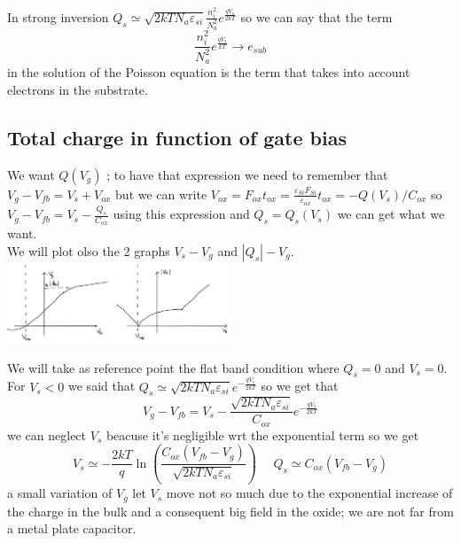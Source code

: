 \vspace{5mm}
In strong inversion $Q_s\simeq \sqrt{2kTN_a\varepsilon_{si}}\frac{n_i^2}{N_a^2}e^{\frac{qV_s}{2kT}}$ so we can say that the term
\begin{equation}
\frac{n_i^2}{N_a^2}e^{\frac{qV_s}{kT}}\rightarrow e_{sub}
\end{equation}
in the solution of the Poisson equation is the term that takes into account electrons in the substrate.\\

\subsection{Total charge in function of gate bias}
We want $Q(V_g)$ ; to have that expression we need to remember that $V_g-V_{fb}=V_s+V_{ox}$ but we can write $V_{ox}=F_{ox}t_{ox}=\frac{\varepsilon_{Si}F_{Si}}{\varepsilon_{ox}}t_{ox}=-Q(V_s)/C_{ox}$ so $V_g-V_{fb}=V_s-\frac{Q_s}{C_{ox}}$ using this expression and $Q_s=Q_s(V_s)$ we can get what we want.\\
We will plot olso the 2 graphs $V_s-V_g$ and $|Q_s|-V_g$.\\

\centering
\includegraphics[width=0.5\textwidth]{qvs.png}\\
\raggedright


We will take as reference point the flat band condition where $Q_s=0$ and $V_s=0$.\\

\vspace{5mm}
For $V_s<0$ we said that  $Q_s\simeq \sqrt{2kTN_a\varepsilon_{si}}e^{-\frac{qV_s}{2kT}}$ so we get that
\begin{equation}
V_g-V_{fb}=V_s-\frac{\sqrt{2kTN_a\varepsilon_{si}}}{C_{ox}}e^{-\frac{qV_s}{2kT}}
\end{equation} 
we can neglect $V_s$ beacuse it's negligible wrt the exponential term so we get 
\begin{equation}
V_s\simeq-\frac{2kT}{q}\ln\left(\frac{C_{ox}(V_{fb}-V_g)}{\sqrt{2kTN_a\varepsilon_{si}}} \right) \ \ \ \ \ \ Q_s\simeq C_{ox}(V_{fb}-V_g)
\end{equation}
a small variation of $V_g$ let $V_s$ move not so much due to the exponential increase of the charge in the bulk and a consequent big field in the oxide; we are not far from a metal plate capacitor.\\

